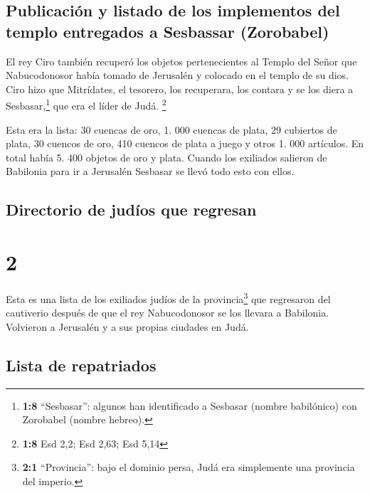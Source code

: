 \hypertarget{publicaciuxf3n-y-listado-de-los-implementos-del-templo-entregados-a-sesbassar-zorobabel}{%
\subsection{Publicación y listado de los implementos del templo
entregados a Sesbassar
(Zorobabel)}\label{publicaciuxf3n-y-listado-de-los-implementos-del-templo-entregados-a-sesbassar-zorobabel}}

 El rey Ciro también recuperó los objetos pertenecientes
al Templo del Señor que Nabucodonosor había tomado de Jerusalén y
colocado en el templo de su dios.  Ciro hizo que
Mitrídates, el tesorero, los recuperara, los contara y se los diera a
Sesbasar,\footnote{\textbf{1:8} ``Sesbasar'': algunos han identificado a
  Sesbasar (nombre babilónico) con Zorobabel (nombre hebreo).} que era
el líder de Judá. \footnote{\textbf{1:8} Esd 2,2; Esd 2,63; Esd 5,14}

 Esta era la lista: 30 cuencas de oro, 1. 000 cuencas de
plata, 29 cubiertos de plata,  30 cuencos de oro, 410
cuencos de plata a juego y otros 1. 000 artículos.  En
total había 5. 400 objetos de oro y plata. Cuando los exiliados salieron
de Babilonia para ir a Jerusalén Sesbasar se llevó todo esto con ellos.

\hypertarget{directorio-de-juduxedos-que-regresan}{%
\subsection{Directorio de judíos que
regresan}\label{directorio-de-juduxedos-que-regresan}}

\hypertarget{section-1}{%
\section{2}\label{section-1}}

 Esta es una lista de los exiliados judíos de la
provincia\footnote{\textbf{2:1} ``Provincia'': bajo el dominio persa,
  Judá era simplemente una provincia del imperio.} que regresaron del
cautiverio después de que el rey Nabucodonosor se los llevara a
Babilonia. Volvieron a Jerusalén y a sus propias ciudades en Judá.

\hypertarget{lista-de-repatriados}{%
\subsection{Lista de repatriados}\label{lista-de-repatriados}}

